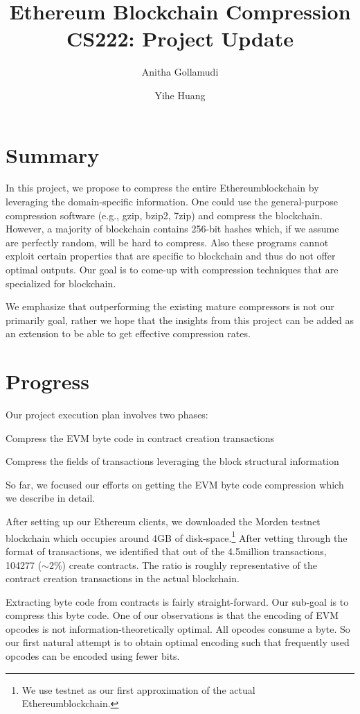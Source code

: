 \documentclass[12pt]{article}
\title{Ethereum Blockchain Compression\\
	\large CS222: Project Update
	}
\author{Anitha Gollamudi 
	\and
	Yihe Huang}
\newcommand\peth{Ethereum}
\begin{document}
%

\maketitle

\section{Summary}
In this project, we propose to compress the entire \peth blockchain by leveraging the domain-specific information.
One could use the general-purpose compression software (e.g., gzip, bzip2, 7zip) and compress the blockchain.
However, a majority of blockchain contains 256-bit hashes which, if we assume are perfectly random, will be hard to compress.
Also these programs cannot exploit certain properties that are specific to blockchain and thus do not offer optimal outputs.
Our goal is to come-up with compression techniques that  are specialized for blockchain.

We emphasize that outperforming the existing mature compressors is not our primarily goal, rather
we hope that the insights from this project can be added as an extension to be able to get effective compression rates.   

\section{Progress}
Our project execution plan involves two phases: 
\begin{enumerate*}
	\item Compress the EVM byte code in contract creation transactions 
	\item Compress the fields of transactions leveraging the block structural information
\end{enumerate*}
So far, we focused our efforts on getting the EVM byte code compression which we describe in detail.

After setting up our Ethereum clients, we downloaded the Morden testnet blockchain which occupies around 4GB of disk-space.\footnote{We use testnet as our first approximation of the actual \peth blockchain.}
After vetting through the format of transactions, we identified that out of the 4.5million transactions,  104277 ($\sim$2\%) create contracts.
The ratio is roughly representative of the contract creation transactions in the actual blockchain.

Extracting byte code from contracts is fairly straight-forward. Our sub-goal is to compress this byte code.
One of our observations is that the encoding of EVM opcodes is not information-theoretically optimal. All opcodes consume a byte.
So our first natural attempt is to obtain optimal encoding such that frequently used opcodes can be encoded using fewer bits.
\end{document}
